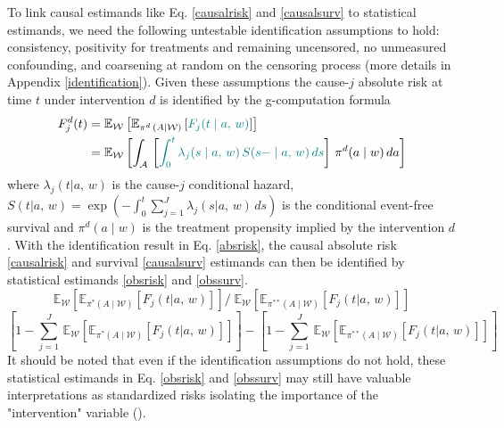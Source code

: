 \documentclass{report}
\newcommand{\1}{\ensuremath{\mathbf{1}}}
\newcommand{\ax}{\ensuremath{\mid a,\,{w}}}
\newcommand{\g}{\ensuremath{\pi}}
\renewcommand{\L}{\ensuremath{W}}
\renewcommand{\l}{\ensuremath{w}}
\begin{document}
To link causal estimands like Eq. \eqref{causalrisk} and \eqref{causalsurv} to statistical estimands, we need the following untestable identification assumptions to hold: consistency, positivity for treatments and remaining uncensored, no unmeasured confounding, and coarsening at random on the censoring process (more details in Appendix \ref{identification}). Given these assumptions the cause-\(j\) absolute risk at time \(t\) under intervention \(d\) is identified by the g-computation formula
\begin{align}
F^d_j(t) &= \mathbb{E}_{\mathcal{\L}} \left[ \mathbb{E}_{\g^d \, (A \mid \mathcal{W})} \left[{\color{blue!50!green} F_j(t \ax)} \right] \right] \nonumber \\
&= \mathbb{E}_{\mathcal{\L}} \left[ \int_{\mathcal{A}} \,  \left[{\color{blue!50!green} \int_0^t \lambda_j(s \ax) \, S(s- \ax) \, ds }\right] \, \g^d (a \mid \l) \, da \right] \label{absrisk}
\end{align}
where \(\lambda_j(t \ax)\) is the cause-\(j\) conditional hazard, \(S(t \ax) = \exp\left(-\int^{t}_{0} \sum\limits_{j=1}^{J} \lambda_j(s \ax) \, ds \right)\) is the conditional event-free survival and \(\g^d(a \mid \l)\) is the treatment propensity implied by the intervention \(d\). With the identification result in Eq. \eqref{absrisk}, the causal absolute risk \eqref{causalrisk} and survival \eqref{causalsurv} estimands can then be identified by statistical estimands \eqref{obsrisk} and \eqref{obssurv}.
\begin{equation}
\mathbb{E}_{\mathcal{\L}} \left[ \mathbb{E}_{\g^*(A \mid \mathcal{W})} \left[ F_j(t \ax) \right] \right] / \; \mathbb{E}_{\mathcal{\L}} \left[ \mathbb{E}_{\g^{**}(A \mid \mathcal{W})} \left[ F_j(t \ax) \right] \right] \label{obsrisk}
\end{equation}
\begin{equation}
\left[1 - \sum_{j = 1}^{J} \, \mathbb{E}_{\mathcal{\L}} \left[ \mathbb{E}_{\g^*(A \mid \mathcal{W})} \left[ F_j(t \ax) \right] \right] \right] - \left[1 - \sum_{j = 1}^{J} \, \mathbb{E}_{\mathcal{\L}} \left[ \mathbb{E}_{\g^{**}(A \mid \mathcal{W})} \left[ F_j(t \ax) \right] \right] \right] \label{obssurv}
\end{equation}
It should be noted that even if the identification assumptions do not hold, these statistical estimands in Eq. \eqref{obsrisk} and \eqref{obssurv} may still have valuable interpretations as standardized risks isolating the importance of the "intervention" variable (\cite{laan_statistical_2006}).
\end{document}
